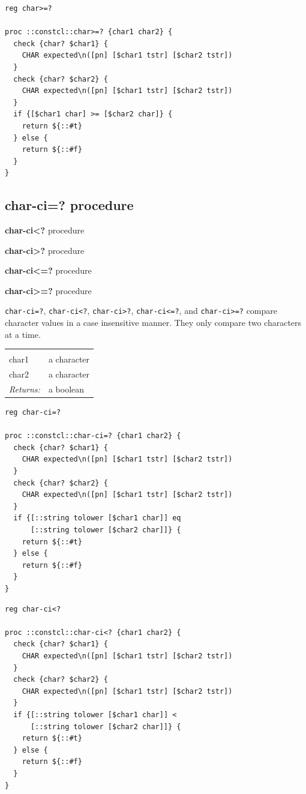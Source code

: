 \documentclass[twoside]{report}
\begin{document}
\begin{lstlisting}
reg char>=?

proc ::constcl::char>=? {char1 char2} {
  check {char? $char1} {
    CHAR expected\n([pn] [$char1 tstr] [$char2 tstr])
  }
  check {char? $char2} {
    CHAR expected\n([pn] [$char1 tstr] [$char2 tstr])
  }
  if {[$char1 char] >= [$char2 char]} {
    return ${::#t}
  } else {
    return ${::#f}
  }
}
\end{lstlisting}

\subsection{char-ci=? procedure}
\label{charci-procedure}

\noindent \textbf{char-ci<?} procedure

\noindent \textbf{char-ci>?} procedure

\noindent \textbf{char-ci<=?} procedure

\noindent \textbf{char-ci>=?} procedure

\texttt{char-ci=?}, \texttt{char-ci<?}, \texttt{char-ci>?}, \texttt{char-ci<=?}, and \texttt{char-ci>=?} compare character values in a case insensitive manner. They only compare two characters at a time.

\noindent\begin{tabular}{ |p{1.9cm} p{8cm}| }
\hline
\rowcolor[HTML]{CCCCCC} \multicolumn{2}{|l|}{\bf char-ci=?, char-ci<?, char-ci>?, char-ci<=?, char-ci>=? (public)} \\
char1 & a character \\
char2 & a character \\
\textit{Returns:} & a boolean \\
\hline
\end{tabular}

\begin{lstlisting}
reg char-ci=?

proc ::constcl::char-ci=? {char1 char2} {
  check {char? $char1} {
    CHAR expected\n([pn] [$char1 tstr] [$char2 tstr])
  }
  check {char? $char2} {
    CHAR expected\n([pn] [$char1 tstr] [$char2 tstr])
  }
  if {[::string tolower [$char1 char]] eq
      [::string tolower [$char2 char]]} {
    return ${::#t}
  } else {
    return ${::#f}
  }
}
\end{lstlisting}

\begin{lstlisting}
reg char-ci<?

proc ::constcl::char-ci<? {char1 char2} {
  check {char? $char1} {
    CHAR expected\n([pn] [$char1 tstr] [$char2 tstr])
  }
  check {char? $char2} {
    CHAR expected\n([pn] [$char1 tstr] [$char2 tstr])
  }
  if {[::string tolower [$char1 char]] <
      [::string tolower [$char2 char]]} {
    return ${::#t}
  } else {
    return ${::#f}
  }
}
\end{lstlisting}
\end{document}

